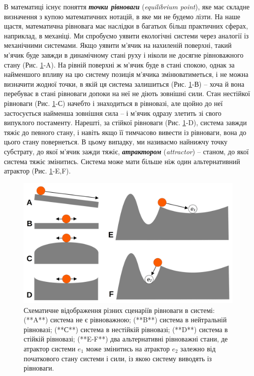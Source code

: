 \documentclass[
  11pt,
]{book}
\begin{document}
В математиці існує поняття \textbf{\emph{точки рівноваги}} (\emph{equilibrium point}), яке має складне визначення з купою математичних нотацій, в яке ми не будемо лізти. На наше щастя, математична рівновага має наслідки в багатьох більш практичних сферах, наприклад, в механіці. Ми спробуємо уявити екологічні системи через аналогії із механічними системами. Якщо уявити м'ячик на нахиленій поверхні, такий м'ячик буде завжди в динамічному стані руху і ніколи не досягне рівноважного стану (Рис. \ref{fig:fig-equilibria}-A). На рівній поверхні ж м'ячик буде в стані спокою, однак за найменшого впливу на цю систему позиція м'ячика змінюватиметься, і не можна визначити жодної точки, в якій ця система залишиться (Рис. \ref{fig:fig-equilibria}-В) -- хоча й вона перебуває в стані рівноваги допоки на неї не діють зовнішні сили. Стан нестійкої рівноваги (Рис. \ref{fig:fig-equilibria}-С) начебто і знаходиться в рівновазі, але щойно до неї застосується найменша зовнішня сила -- і м'ячик одразу злетить зі свого випуклого постаменту. Нарешті, за стійкої рівноваги (Рис. \ref{fig:fig-equilibria}-D), система завжди тяжіє до певного стану, і навіть якщо її тимчасово вивести із рівноваги, вона до цього стану повернеться. В цьому випадку, ми називаємо найнижчу точку субстрату, до якої м'ячик зажди тяжіє, \textbf{\emph{атрактором}} (\emph{attractor}) -- станом, до якої система тяжіє змінитись. Система може мати більше ніж один альтернативний атрактор (Рис. \ref{fig:fig-equilibria}-E,F).

\begin{figure}
\includegraphics[width=47.11in]{images/equilibria} \caption{Схематичне відображення різних сценаріїв рівноваги в системі: (**A**) система не є рівноважною; (**B**) система в нейтральній рівновазі; (**С**) система в нестійкій рівновазі; (**D**) система в стійкій рівновазі; (**E-F**) два альтернативні рівноважні стани, де атрактор системи $e_1$ може змінитись на атрактор $e_2$ залежно від початкового стану системи і сили, із якою систему виводять із рівноваги.}\label{fig:fig-equilibria}
\end{figure}
\end{document}
